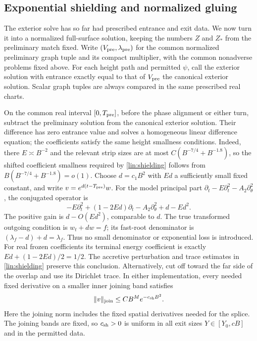 \subsection{Exponential shielding and normalized gluing}

The exterior solve has so far had prescribed entrance and exit data.
We now turn it into a normalized full-surface solution, keeping the
numbers $Z$ and $Z_*$ from the preliminary match fixed.  Write
$(V_{\rm pre},\lambda_{\rm pre})$ for the common normalized
preliminary graph tuple and its compact multiplier, with the common
nonadverse problems fixed above.  For each height
path and permitted $\psi$, call the exterior solution with entrance
exactly equal to that of $V_{\rm pre}$ the canonical exterior
solution.  Scalar graph tuples are always compared in the same
prescribed real charts.

On the common real interval $[0,T_{\rm pre}]$, before the phase
alignment or either turn, subtract the
preliminary solution from the canonical exterior solution.  Their difference
has zero entrance value and solves a homogeneous linear difference
equation; the coefficients satisfy the same height smallness
conditions.  Indeed, there $E\asymp B^{-2}$ and the relevant
strip sizes are at most $C(B^{-7/4}+B^{-1.8})$, so the shifted
coefficient smallness required by \cref{lin:shielding} follows from
$B(B^{-7/4}+B^{-1.8})=o(1)$.  Choose
$d=c_1B^2$ with $Ed$ a sufficiently small fixed constant, and write
$v=e^{d(t-T_{\rm pre})}w$.  For the model principal part
$\partial_t-E\partial_t^2-A_2\partial_\theta^2$, the conjugated
operator is
\begin{equation}\label{jump:large-shift}
 -E\partial_t^2+(1-2Ed)\partial_t
 -A_2\partial_\theta^2+d-Ed^2.
\end{equation}
The positive gain is $d-O(Ed^2)$, comparable to $d$.
The true transformed outgoing condition is
$w_t+dw=f$; its fast-root denominator is
$(\lambda_f-d)+d=\lambda_f$.  Thus no small denominator or
exponential loss is introduced.  For real frozen coefficients its
terminal energy coefficient is exactly
$Ed+(1-2Ed)/2=1/2$.  The accretive perturbation and trace estimates
in \cref{lin:shielding} preserve this conclusion.  Alternatively,
cut off toward the far side of the overlap and use its Dirichlet
trace.  In either implementation, every needed fixed derivative on
a smaller inner joining band satisfies
\begin{equation}\label{jump:shield}
 \|v\|_{\rm join}\leq CB^M e^{-c_{\rm sh}B^2}.
\end{equation}
Here the joining norm includes the fixed spatial derivatives needed
for the splice.  The joining bands are fixed, so $c_{\rm sh}>0$ is
uniform in all exit sizes $Y\in[Y_0,cB]$ and in the permitted data.

